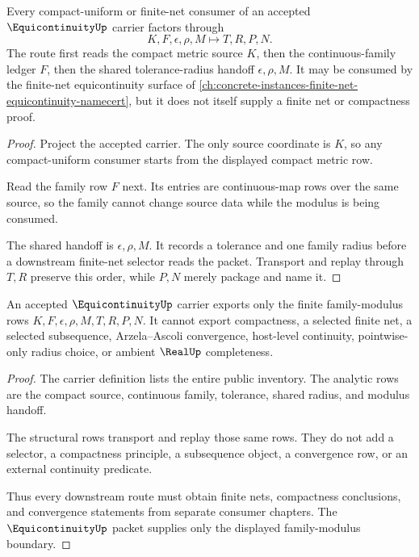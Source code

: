 \begin{theorem}
\label{thm:equicontinuity-compact-metric-route}
Every compact-uniform or finite-net consumer of an accepted $\EquicontinuityUp$ carrier factors through
$$
K,F,\epsilon,\rho,M \longmapsto T,R,P,N .
$$
The route first reads the compact metric source $K$, then the continuous-family ledger $F$, then the shared tolerance-radius handoff $\epsilon,\rho,M$. It may be consumed by the finite-net equicontinuity surface of \autoref{ch:concrete-instances-finite-net-equicontinuity-namecert}, but it does not itself supply a finite net or compactness proof.
\end{theorem}
\begin{proof}
Project the accepted carrier. The only source coordinate is $K$, so any compact-uniform consumer starts from the displayed compact metric row.

Read the family row $F$ next. Its entries are continuous-map rows over the same source, so the family cannot change source data while the modulus is being consumed.

The shared handoff is $\epsilon,\rho,M$. It records a tolerance and one family radius before a downstream finite-net selector reads the packet. Transport and replay through $T,R$ preserve this order, while $P,N$ merely package and name it.
\end{proof}

\begin{theorem}
\label{thm:equicontinuity-nonescape}
An accepted $\EquicontinuityUp$ carrier exports only the finite family-modulus rows $K,F,\epsilon,\rho,M,T,R,P,N$. It cannot export compactness, a selected finite net, a selected subsequence, Arzela--Ascoli convergence, host-level continuity, pointwise-only radius choice, or ambient $\RealUp$ completeness.
\end{theorem}
\begin{proof}
The carrier definition lists the entire public inventory. The analytic rows are the compact source, continuous family, tolerance, shared radius, and modulus handoff.

The structural rows transport and replay those same rows. They do not add a selector, a compactness principle, a subsequence object, a convergence row, or an external continuity predicate.

Thus every downstream route must obtain finite nets, compactness conclusions, and convergence statements from separate consumer chapters. The $\EquicontinuityUp$ packet supplies only the displayed family-modulus boundary.
\end{proof}

